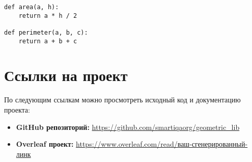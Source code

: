 \documentclass[a4paper,12pt]{article}
\begin{document}
\begin{lstlisting}[caption={Код для вычисления площади и периметра треугольника}]
def area(a, h):
    return a * h / 2

def perimeter(a, b, c):
    return a + b + c
\end{lstlisting}

\newpage

\section{Ссылки на проект}
По следующим ссылкам можно просмотреть исходный код и документацию проекта:

\begin{itemize}
    \item \textbf{GitHub репозиторий:}  
    \url{https://github.com/smartiqaorg/geometric_lib}

    \item \textbf{Overleaf проект:}  
    \url{https://www.overleaf.com/read/ваш-сгенерированный-линк}
\end{itemize}
\end{document}
